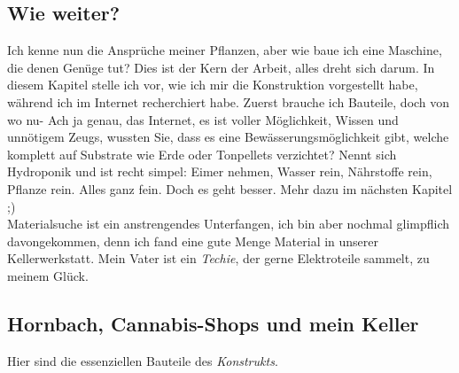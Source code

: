 \documentclass[12pt,titlepage,a4paper]{article}
\begin{document}
\subsection{Wie weiter?}
Ich kenne nun die Ansprüche meiner Pflanzen, aber wie baue ich eine Maschine, die denen Genüge tut? Dies ist der Kern der Arbeit, alles dreht sich darum. In diesem Kapitel stelle ich vor, wie ich mir die Konstruktion vorgestellt habe, während ich im Internet recherchiert habe. Zuerst brauche ich Bauteile, doch von wo nu- Ach ja genau, das Internet, es ist voller Möglichkeit, Wissen und unnötigem Zeugs, wussten Sie, dass es eine Bewässerungsmöglichkeit gibt, welche komplett auf Substrate wie Erde oder Tonpellets verzichtet? Nennt sich Hydroponik und ist recht simpel: Eimer nehmen, Wasser rein, Nährstoffe rein, Pflanze rein. Alles ganz fein. Doch es geht besser. Mehr dazu im nächsten Kapitel ;) \\
Materialsuche ist ein anstrengendes Unterfangen, ich bin aber nochmal glimpflich davongekommen, denn ich fand  eine gute Menge Material in unserer Kellerwerkstatt. Mein Vater ist ein \textit{Techie}, der gerne Elektroteile sammelt, zu meinem Glück.

\subsection{Hornbach, Cannabis-Shops und mein Keller}
Hier sind die essenziellen Bauteile des \textit{Konstrukts}.
\end{document}
